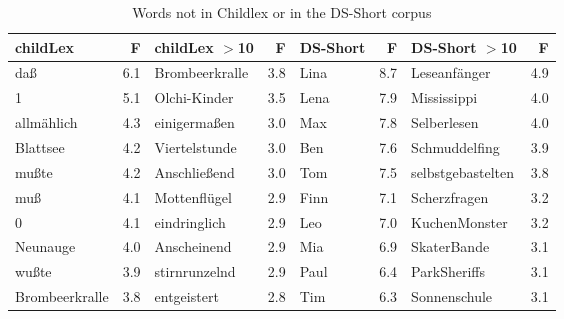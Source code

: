 \documentclass[doc, a4paper, anonymous]{apa7}
\begin{document}
\begin{table}[!htbp]
\caption{Words not in Childlex or in the DS-Short corpus}
\centering
\begin{tabular}{lrlrlrlr}
  \hline
childLex & F & childLex $>$10 & F & DS-Short & F & DS-Short $>$10 & F \\ 
  \hline
daß & 6.1 & Brombeerkralle & 3.8 & Lina & 8.7 & Leseanfänger & 4.9 \\ 
  1 & 5.1 & Olchi-Kinder & 3.5 & Lena & 7.9 & Mississippi & 4.0 \\ 
  allmählich & 4.3 & einigermaßen & 3.0 & Max & 7.8 & Selberlesen & 4.0 \\ 
  Blattsee & 4.2 & Viertelstunde & 3.0 & Ben & 7.6 & Schmuddelfing & 3.9 \\ 
  mußte & 4.2 & Anschließend & 3.0 & Tom & 7.5 & selbstgebastelten & 3.8 \\ 
  muß & 4.1 & Mottenflügel & 2.9 & Finn & 7.1 & Scherzfragen & 3.2 \\ 
  0 & 4.1 & eindringlich & 2.9 & Leo & 7.0 & KuchenMonster & 3.2 \\ 
  Neunauge & 4.0 & Anscheinend & 2.9 & Mia & 6.9 & SkaterBande & 3.1 \\ 
  wußte & 3.9 & stirnrunzelnd & 2.9 & Paul & 6.4 & ParkSheriffs & 3.1 \\ 
  Brombeerkralle & 3.8 & entgeistert & 2.8 & Tim & 6.3 & Sonnenschule & 3.1 \\ 
   \hline
\end{tabular}
\label{words-dssh}
\end{table}
\end{document}
